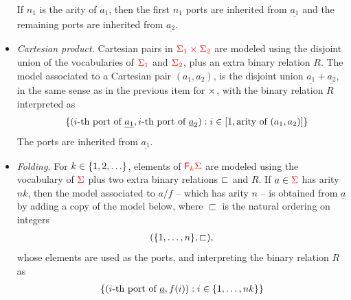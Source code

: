 \begin{definition}
\begin{itemize}
            If $n_1$ is the arity of $a_1$, then the first $n_1$ ports are inherited from  $\underline {a_1}$ and the remaining ports are inherited from  $\underline {a_2}$.
        \item \emph{Cartesian product.}   Cartesian pairs in  ${\color{red}{\Sigma_1 \times\Sigma_2}}$ are modeled  using the disjoint union of the vocabularies of ${\color{red}{\Sigma_1}}$ and ${\color{red}{\Sigma_2}}$, plus an extra binary relation $R$.  
            The model associated to a Cartesian pair   $ (a_1,a_2)$,  is      the disjoint union $\underline{a_1} +  \underline {a_2}$, in the same sense as in the previous item for $\times$,  with the binary relation $R$ interpreted as 
                \begin{align*}
                   \quad \{(\text{$i$-th port of $\underline {a_1}$}, \text{$i$-th port of $\underline a_2$}): i \in [1,\text{arity of $(a_1,a_2)$}]\} 
                \end{align*}
                The ports are inherited from   $\underline {a_1}$.
        \item \emph{Folding.}   For $k \in \{1,2,\ldots\}$, elements of   ${\color{red}{\mathsf F_{k}}}{\color{red}{\Sigma}}$ are modeled using the  vocabulary of ${\color{red}{\Sigma}}$ plus two extra binary relations $\sqsubset$ and $R$. If $a \in {\color{red}{\Sigma}}$ has arity $nk$, then the model associated to $a/f$ -- which has arity $n$ --   is obtained from  $\underline{a}$ by adding a copy of the model below, where $\sqsubset$ is the natural ordering on integers
                \begin{align*}
                (\{1,\ldots,n\}, \sqsubset),
                \end{align*}
whose elements are used as the ports, and interpreting the binary relation $R$ as
        \begin{align*}
        \{(\text{$i$-th port of $\underline a$},f(i)) : i \in \{1,\ldots,nk\}\}
        \end{align*}
                

\end{itemize}
\end{definition}
